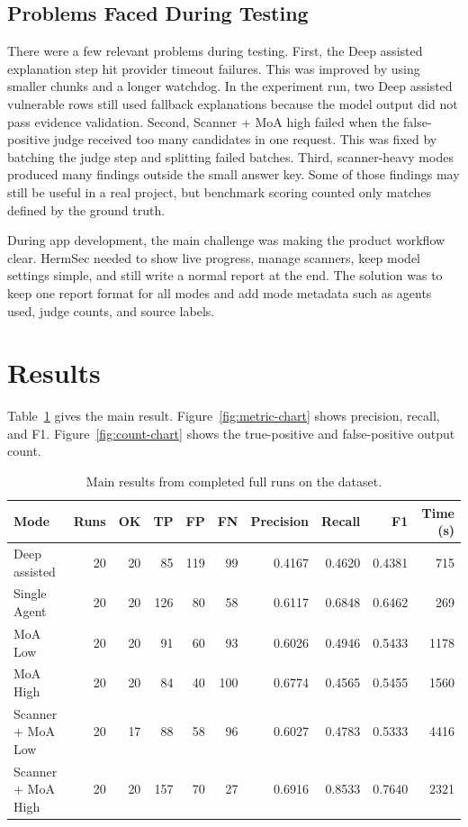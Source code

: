 \documentclass[sigconf,nonacm]{acmart}
\begin{document}
\subsection{Problems Faced During Testing}
There were a few relevant problems during testing. First, the Deep assisted explanation step hit provider timeout failures. This was improved by using smaller chunks and a longer watchdog. In the experiment run, two Deep assisted vulnerable rows still used fallback explanations because the model output did not pass evidence validation. Second, Scanner + MoA high failed when the false-positive judge received too many candidates in one request. This was fixed by batching the judge step and splitting failed batches. Third, scanner-heavy modes produced many findings outside the small answer key. Some of those findings may still be useful in a real project, but benchmark scoring counted only matches defined by the ground truth.

During app development, the main challenge was making the product workflow clear. HermSec needed to show live progress, manage scanners, keep model settings simple, and still write a normal report at the end. The solution was to keep one report format for all modes and add mode metadata such as agents used, judge counts, and source labels.

\section{Results}
Table~\ref{tab:main-results} gives the main result. Figure~\ref{fig:metric-chart} shows precision, recall, and F1. Figure~\ref{fig:count-chart} shows the true-positive and false-positive output count.

\begin{table}[!htbp]
  \centering
  \caption{Main results from completed full runs on the dataset.}
  \label{tab:main-results}
  \begin{tabular}{lrrrrrrrrr}
    \toprule
    Mode & Runs & OK & TP & FP & FN & Precision & Recall & F1 & Time (s) \\
    \midrule
    Deep assisted & 20 & 20 & 85 & 119 & 99 & 0.4167 & 0.4620 & 0.4381 & 715 \\
    Single Agent & 20 & 20 & 126 & 80 & 58 & 0.6117 & 0.6848 & 0.6462 & 269 \\
    MoA Low & 20 & 20 & 91 & 60 & 93 & 0.6026 & 0.4946 & 0.5433 & 1178 \\
    MoA High & 20 & 20 & 84 & 40 & 100 & 0.6774 & 0.4565 & 0.5455 & 1560 \\
    Scanner + MoA Low & 20 & 17 & 88 & 58 & 96 & 0.6027 & 0.4783 & 0.5333 & 4416 \\
    Scanner + MoA High & 20 & 20 & 157 & 70 & 27 & 0.6916 & 0.8533 & 0.7640 & 2321 \\
    \bottomrule
  \end{tabular}
\end{table}
\end{document}

